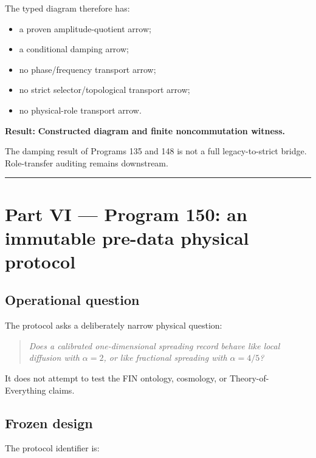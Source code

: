 \documentclass[11pt,a4paper,openany]{report}
\begin{document}
The typed diagram therefore has:

\begin{itemize}
\item 
a proven amplitude-quotient arrow;

\item 
a conditional damping arrow;

\item 
no phase/\allowbreak{}frequency transport arrow;

\item 
no strict selector/\allowbreak{}topological transport arrow;

\item 
no physical-role transport arrow.

\end{itemize}

\textbf{Result:} \textbf{Constructed diagram and finite noncommutation witness.}

The damping result of Programs 135 and 148 is not a full legacy-to-strict bridge. Role-transfer auditing remains downstream.

\par\medskip\hrule\medskip

\chapter{Part VI --- Program 150: an immutable pre-data physical protocol}

\section{Operational question}

The protocol asks a deliberately narrow physical question:

\begin{quote}\itshape
Does a calibrated one-dimensional spreading record behave like local diffusion with \(\alpha=2\), or like fractional spreading with \(\alpha=4/5\)?

\end{quote}

It does not attempt to test the FIN ontology, cosmology, or Theory-of- Everything claims.

\section{Frozen design}

The protocol identifier is:
\end{document}
